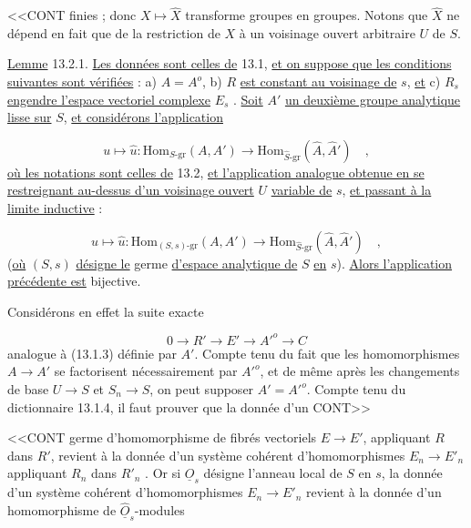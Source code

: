 <<CONT finies ; donc $X \longmapsto \hat{X}$ transforme groupes en groupes. Notons que $\hat{X}$ ne dépend en fait que de la restriction de $X$ à un voisinage ouvert arbitraire $U$ de $S$.

\underline{Lemme} 13.2.1. \underline{Les données sont celles de} 13.1, \underline{et on suppose que les conditions suivantes sont vérifiées} : a) $A = A^{o}$,  b)  $R$ \underline{est constant au voisinage de} $s$, \underline{et} c) $R_s$ \underline{engendre l'espace vectoriel complexe} $E_s$ . \underline{Soit} $A'$ \underline{un deuxième groupe analytique lisse sur} $S$, \underline{et considérons l'application}

\begin{equation*}
u \longmapsto \hat{u} : \mathrm{Hom}_{S\text{-}\mathrm{gr}}(A,A') \longrightarrow \mathrm{Hom}_{\hat{S}\text{-}\mathrm{gr}}(\hat{A},\hat{A}') \quad ,
\end{equation*}
\underline{où les notations sont celles de} 13.2, \underline{et l'application analogue obtenue en se restreignant au-dessus d'un voisinage ouvert} $U$ \underline{variable de} $s$, \underline{et passant à la limite inductive} :

\begin{equation}\tag{13.2.1.1}
u \longmapsto \hat{u} : \mathrm{Hom}_{(S,s)\text{-}\mathrm{gr}}(A,A') \longrightarrow \mathrm{Hom}_{\hat{S}\text{-}\mathrm{gr}}(\hat{A},\hat{A}') \quad ,
\end{equation}
(\underline{où} $(S,s)$ \underline{désigne le} germe \underline{d'espace analytique de} $S$ \underline{en} $s$). \underline{Alors l'application précédente est} bijective.

Considérons en effet la suite exacte

\begin{equation*}
0 \longrightarrow R' \longrightarrow E' \longrightarrow {A'}^{o} \longrightarrow C
\end{equation*}
analogue à (13.1.3) définie par $A'$. Compte tenu du fait que les homomorphismes $A \longrightarrow A'$ se factorisent nécessairement par ${A'}^{o}$, et de même après les changements de base $U \longrightarrow S$ et $S_n \longrightarrow S$, on peut supposer $A' = {A'}^{o}$. Compte tenu du dictionnaire 13.1.4, il faut prouver que la donnée d'un CONT>>



<<CONT germe d'homomorphisme de fibrés vectoriels $E \longrightarrow E'$, appliquant $R$ dans $R'$, revient à la donnée d'un système cohérent d'homomorphismes $E_n \longrightarrow E'_n$ appliquant $R_n$ dans $R'_n$ . Or si $\underline{O}_s$ désigne l'anneau local de $S$ en $s$, la donnée d'un système cohérent d'homomorphismes $E_n \longrightarrow E'_n$ revient à la donnée d'un homomorphisme de $\hat{\underline{O}}_s$-modules

